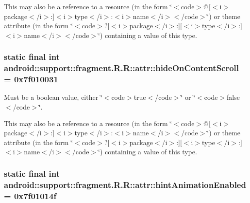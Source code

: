 This may also be a reference to a resource (in the form \char`\"{}$<$code$>$@\mbox{[}$<$i$>$package$<$/i$>$:\mbox{]}$<$i$>$type$<$/i$>$:$<$i$>$name$<$/i$>$$<$/code$>$\char`\"{}) or theme attribute (in the form \char`\"{}$<$code$>$?\mbox{[}$<$i$>$package$<$/i$>$:\mbox{]}\mbox{[}$<$i$>$type$<$/i$>$:\mbox{]}$<$i$>$name$<$/i$>$$<$/code$>$\char`\"{}) containing a value of this type. \hypertarget{classandroid_1_1support_1_1fragment_1_1_r_1_1attr_a3c533cf8ea2cb83b6ebd835e7186231}{
\subsubsection[{hideOnContentScroll}]{\setlength{\rightskip}{0pt plus 5cm}static final int android::support::fragment.R.R::attr::hideOnContentScroll = 0x7f010031}}
\label{classandroid_1_1support_1_1fragment_1_1_r_1_1attr_a3c533cf8ea2cb83b6ebd835e7186231}


Must be a boolean value, either \char`\"{}$<$code$>$true$<$/code$>$\char`\"{} or \char`\"{}$<$code$>$false$<$/code$>$\char`\"{}. 

This may also be a reference to a resource (in the form \char`\"{}$<$code$>$@\mbox{[}$<$i$>$package$<$/i$>$:\mbox{]}$<$i$>$type$<$/i$>$:$<$i$>$name$<$/i$>$$<$/code$>$\char`\"{}) or theme attribute (in the form \char`\"{}$<$code$>$?\mbox{[}$<$i$>$package$<$/i$>$:\mbox{]}\mbox{[}$<$i$>$type$<$/i$>$:\mbox{]}$<$i$>$name$<$/i$>$$<$/code$>$\char`\"{}) containing a value of this type. \hypertarget{classandroid_1_1support_1_1fragment_1_1_r_1_1attr_73e9b15a8b734b825631541629aba11d}{
\subsubsection[{hintAnimationEnabled}]{\setlength{\rightskip}{0pt plus 5cm}static final int android::support::fragment.R.R::attr::hintAnimationEnabled = 0x7f01014f}}
\label{classandroid_1_1support_1_1fragment_1_1_r_1_1attr_73e9b15a8b734b825631541629aba11d}


